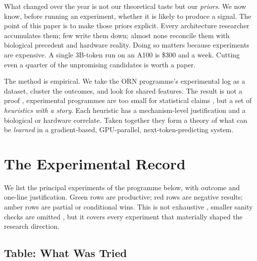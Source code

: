 \documentclass[11pt, a4paper]{article}
\begin{document}
What changed over the year is not our theoretical taste but our \emph{priors}. We now know, before running an experiment, whether it is likely to produce a signal. The point of this paper is to make those priors explicit. Every architecture researcher accumulates them; few write them down; almost none reconcile them with biological precedent and hardware reality. Doing so matters because experiments are expensive. A single 3B-token run on an A100 is \$300 and a week. Cutting even a quarter of the unpromising candidates is worth a paper.

The method is empirical. We take the ORN programme's experimental log as a dataset, cluster the outcomes, and look for shared features. The result is not a proof ,  experimental programmes are too small for statistical claims ,  but a set of \emph{heuristics with a story}. Each heuristic has a mechanism-level justification and a biological or hardware correlate. Taken together they form a theory of what can be \emph{learned} in a gradient-based, GPU-parallel, next-token-predicting system.

\section{The Experimental Record}
\label{sec:record}

We list the principal experiments of the programme below, with outcome and one-line justification. Green rows are productive; red rows are negative results; amber rows are partial or conditional wins. This is not exhaustive ,  smaller sanity checks are omitted ,  but it covers every experiment that materially shaped the research direction.

\subsection{Table: What Was Tried}
\end{document}
